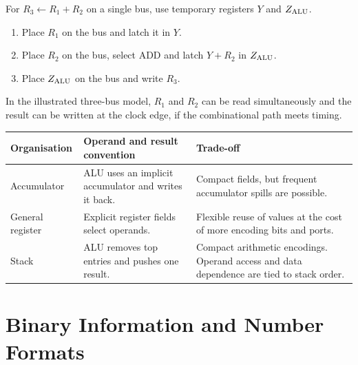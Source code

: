 \documentclass[12pt,a4paper]{article}
\begin{document}
\begin{tcolorbox}[examplebox,title={One-bus versus three-bus addition}]
For $R_3\leftarrow R_1+R_2$ on a single bus, use temporary registers $Y$ and $Z_{\rm ALU}$.
\begin{enumerate}[leftmargin=*,itemsep=2pt]
\item Place $R_1$ on the bus and latch it in $Y$.
\item Place $R_2$ on the bus, select ADD and latch $Y+R_2$ in $Z_{\rm ALU}$.
\item Place $Z_{\rm ALU}$ on the bus and write $R_3$.
\end{enumerate}
In the illustrated three-bus model, $R_1$ and $R_2$ can be read simultaneously and the result can be written at the clock edge, if the combinational path meets timing.
\end{tcolorbox}

\par\vspace{6pt}\noindent
\begin{tabularx}{\linewidth}{|B{3.2cm}|Y|Y|}\hline
Organisation & Operand and result convention & Trade-off \\ \hline
Accumulator & ALU uses an implicit accumulator and writes it back. & Compact fields, but frequent accumulator spills are possible. \\ \hline
General register & Explicit register fields select operands. & Flexible reuse of values at the cost of more encoding bits and ports. \\ \hline
Stack & ALU removes top entries and pushes one result. & Compact arithmetic encodings. Operand access and data dependence are tied to stack order. \\ \hline
\end{tabularx}

\section{Binary Information and Number Formats}
\end{document}
